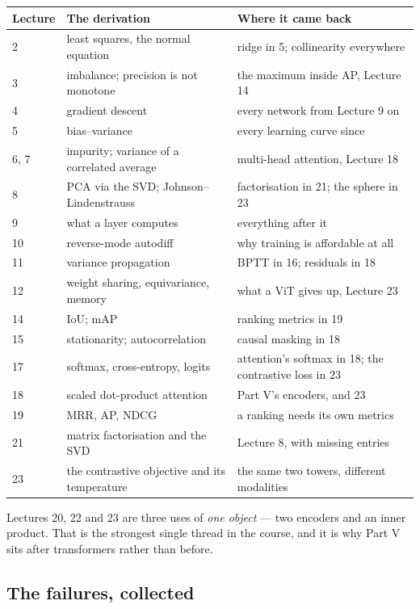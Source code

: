 \documentclass[11pt,a4paper]{article}
\begin{document}
\begin{center}
\small
\begin{tabular}{lp{}p{}}
\toprule
\textbf{Lecture} & \textbf{The derivation} & \textbf{Where it came back} \\
\midrule
2 & least squares, the normal equation & ridge in 5; collinearity everywhere \\
3 & imbalance; precision is not monotone & the maximum inside AP, Lecture 14 \\
4 & gradient descent & every network from Lecture 9 on \\
5 & bias--variance & every learning curve since \\
6, 7 & impurity; variance of a correlated average & multi-head attention,
       Lecture 18 \\
8 & PCA via the SVD; Johnson--Lindenstrauss & factorisation in 21; the sphere
    in 23 \\
9 & what a layer computes & everything after it \\
10 & reverse-mode autodiff & why training is affordable at all \\
11 & variance propagation & BPTT in 16; residuals in 18 \\
12 & weight sharing, equivariance, memory & what a ViT gives up, Lecture 23 \\
14 & IoU; mAP & ranking metrics in 19 \\
15 & stationarity; autocorrelation & causal masking in 18 \\
17 & softmax, cross-entropy, logits & attention's softmax in 18; the
     contrastive loss in 23 \\
18 & scaled dot-product attention & Part V's encoders, and 23 \\
19 & MRR, AP, NDCG & a ranking needs its own metrics \\
21 & matrix factorisation and the SVD & Lecture 8, with missing entries \\
23 & the contrastive objective and its temperature & the same two towers,
     different modalities \\
\bottomrule
\end{tabular}
\end{center}

Lectures 20, 22 and 23 are three uses of \emph{one object} --- two encoders and
an inner product. That is the strongest single thread in the course, and it is
why Part V sits after transformers rather than before.

\subsection{The failures, collected}
\end{document}
